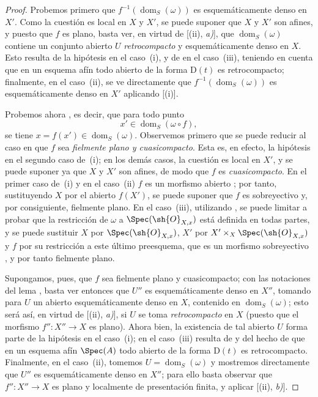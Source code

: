 \begin{proof}
Probemos primero que $f^{-1}(\operatorname{dom}_S(\omega))$ es esquemáticamente denso en $X'$.
Como la cuestión es local en $X$ y $X'$, se puede suponer que $X$ y $X'$ son afines, y puesto que $f$ es plano, basta ver, en virtud de [(ii), \emph{a)}], que $\operatorname{dom}_S(\omega)$ contiene un conjunto abierto $U$ \emph{retrocompacto} y esquemáticamente denso en $X$.
Esto resulta de la hipótesis en el caso~(i), y de  en el caso~(iii), teniendo en cuenta que en un esquema afín todo abierto de la forma $\mathrm{D}(t)$ es retrocompacto; finalmente, en el caso~(ii), se ve directamente que $f^{-1}(\operatorname{dom}_S(\omega))$ es esquemáticamente denso en $X'$ aplicando [(i)].

Probemos ahora , es decir, que para todo punto \[
  x'\in\operatorname{dom}_S(\omega\circ f),
\] se tiene $x=f(x')\in\operatorname{dom}_S(\omega)$.
Observemos primero que se puede reducir al caso en que $f$ sea \emph{fielmente plano y cuasicompacto}.
Esta es, en efecto, la hipótesis en el segundo caso de~(i); en los demás casos, la cuestión es local en $X'$, y se puede suponer ya que $X$ y $X'$ son afines, de modo que $f$ es \emph{cuasicompacto}.
En el primer caso de~(i) y en el caso~(ii) $f$ es un morfismo abierto ; por tanto, sustituyendo $X$ por el abierto $f(X')$, se puede suponer que $f$ es sobreyectivo y, por consiguiente, fielmente plano.
En el caso~(iii), utilizando , se puede limitar a probar que la restricción de $\omega$ a $\Spec(\sh{O}_{X,x})$ está definida en todas partes, y se puede sustituir $X$ por $\Spec(\sh{O}_{X,x})$, $X'$ por $X'\times_X\Spec(\sh{O}_{X,x})$ y $f$ por su restricción a este último preesquema, que es un morfismo sobreyectivo , y por tanto fielmente plano.

Supongamos, pues, que $f$ sea fielmente plano y cuasicompacto; con las notaciones del lema , basta ver entonces que $U''$ es esquemáticamente denso en $X''$, tomando para $U$ un abierto esquemáticamente denso en $X$, contenido en $\operatorname{dom}_S(\omega)$; esto será así, en virtud de [(ii), \emph{a)}], si $U$ se toma \emph{retrocompacto} en $X$ (puesto que el morfismo $f'':X''\to X$ es plano).
Ahora bien, la existencia de tal abierto $U$ forma parte de la hipótesis en el caso~(i); en el caso~(iii) resulta de  y del hecho de que en un esquema afín $\Spec(A)$ todo abierto de la forma $\mathrm{D}(t)$ es retrocompacto.
Finalmente, en el caso~(ii), tomemos $U=\operatorname{dom}_S(\omega)$ y mostremos directamente que $U''$ es esquemáticamente denso en $X''$; para ello basta observar que $f'':X''\to X$ es plano y localmente de presentación finita, y aplicar [(ii), \emph{b)}].
\end{proof}

